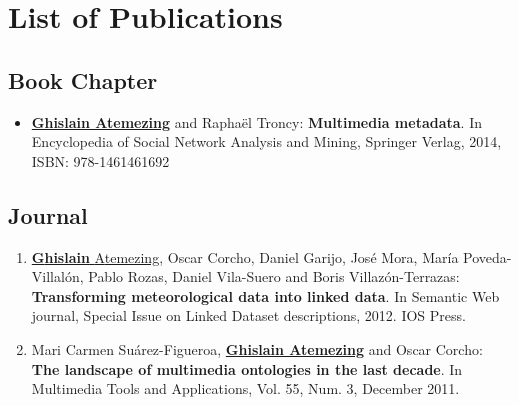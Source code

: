 

\chapter*{List of Publications}

\section*{Book Chapter}
\label{sec:book}
\begin{itemize}
\item \underline{\textbf{Ghislain Atemezing}} and {R}apha{\"e}l {T}roncy: \textbf{{M}ultimedia metadata}. {I}n {E}ncyclopedia of {S}ocial {N}etwork {A}nalysis and {M}ining, {S}pringer {V}erlag, 2014, {ISBN}: 978-1461461692
\end{itemize}

\section*{Journal}
\label{sec:journal}
\begin{enumerate}
 \item \underline{\textbf{{G}hislain} {A}temezing}, {O}scar {C}orcho,  {D}aniel {G}arijo, {J}os{\'e} {M}ora, {M}ar{\'i}a {P}oveda-{V}illal{\'o}n, {P}ablo {R}ozas, {D}aniel {V}ila-{S}uero and {B}oris {V}illaz{\'o}n-{T}errazas: \textbf{{T}ransforming meteorological data into linked data}. In {S}emantic {W}eb journal, {S}pecial {I}ssue on {L}inked {D}ataset descriptions, 2012. {IOS} {P}ress.

 \item Mari Carmen Su\'{a}rez-Figueroa, \underline{\textbf{Ghislain Atemezing}} and Oscar Corcho: \textbf{The landscape of multimedia ontologies in the last decade}. In Multimedia Tools and Applications, Vol. 55, Num. 3, December 2011.
\end{enumerate}

